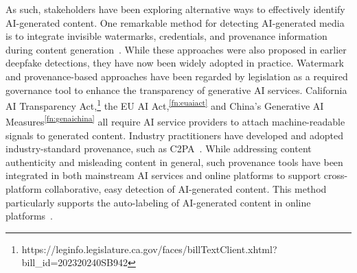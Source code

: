 As such, stakeholders have been exploring alternative ways to effectively identify AI-generated content. One remarkable method for detecting AI-generated media is to integrate invisible watermarks, credentials, and provenance information during content generation~\cite{deng2025survey, zhao2023provable}. While these approaches were also proposed in earlier deepfake detections, they have now been widely adopted in practice. Watermark and provenance-based approaches have been regarded by legislation as a required governance tool to enhance the transparency of generative AI services. California AI Transparency Act,\footnote{https://leginfo.legislature.ca.gov/faces/billTextClient.xhtml\allowbreak?bill\_id=202320240SB942} the EU AI Act,\textsuperscript{\ref{fn:euaiact}} and China's Generative AI Measures\textsuperscript{\ref{fn:genaichina}} all require AI service providers to attach machine-readable signals to generated content. Industry practitioners have developed and adopted industry-standard provenance, such as C2PA~\cite{feng2023examining, C2PA2025,burrus2024unmasking}. While addressing content authenticity and misleading content in general, such provenance tools have been integrated in both mainstream AI services and online platforms to support cross-platform collaborative, easy detection of AI-generated content. This method particularly supports the auto-labeling of AI-generated content in online platforms~\cite{gao2026governance}.

